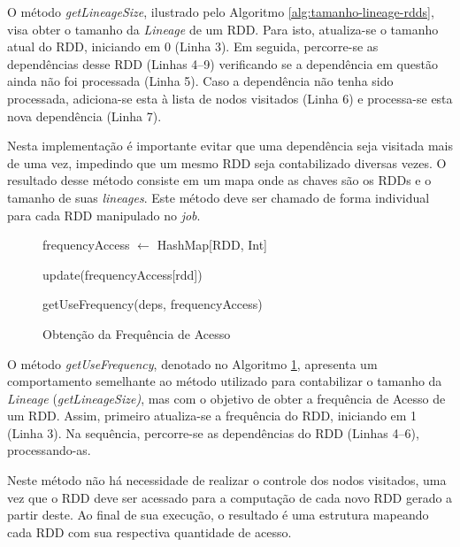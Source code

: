 O método \textit{getLineageSize}, ilustrado pelo Algoritmo \ref{alg:tamanho-lineage-rdds}, visa obter o tamanho da \textit{Lineage} de um RDD. Para isto, atualiza-se o tamanho atual do RDD, iniciando em 0 (Linha 3). Em seguida, percorre-se as dependências desse RDD (Linhas 4--9) verificando se a dependência em questão ainda não foi processada (Linha 5). Caso a dependência não tenha sido processada, adiciona-se esta à lista de nodos visitados (Linha 6) e processa-se esta nova dependência (Linha 7). 

Nesta implementação é importante evitar que uma dependência seja visitada mais de uma vez, impedindo que um mesmo RDD seja contabilizado diversas vezes. O resultado desse método consiste em um mapa onde as chaves são os RDDs e o tamanho de suas \textit{lineages}. Este método deve ser chamado de forma individual para cada RDD manipulado no \textit{job}.

\begin{figure}[!ht]
    \begin{algorithm}[H]
        \caption{Obtenção da Frequência de Acesso}
        \label{alg:frequencia-acesso-rdds}
        frequencyAccess $\leftarrow$ HashMap[RDD, Int]\;
        
         {
           update(frequencyAccess[rdd])\;
           
            {
                getUseFrequency(deps, frequencyAccess)\;
           }
        }
    \end{algorithm}
\end{figure}

O método \textit{getUseFrequency}, denotado no Algoritmo \ref{alg:frequencia-acesso-rdds}, apresenta um comportamento semelhante ao método utilizado para contabilizar o tamanho da \textit{Lineage} (\textit{getLineageSize)}, mas com o objetivo de obter a frequência de Acesso de um RDD. Assim, primeiro atualiza-se a frequência do RDD, iniciando em 1 (Linha 3). Na sequência, percorre-se as dependências do RDD (Linhas 4--6), processando-as. 

Neste método não há necessidade de realizar o controle dos nodos visitados, uma vez que o RDD deve ser acessado para a computação de cada novo RDD gerado a partir deste. Ao final de sua execução, o resultado é uma estrutura mapeando cada RDD com sua respectiva quantidade de acesso.

